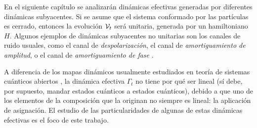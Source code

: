 En el siguiente capítulo se analizarán dinámicas efectivas generadas por diferentes dinámicas subyacentes. Si se asume que el sistema conformado por las partículas es cerrado, entonces la evolución $\mathcal{V}_{t}$ será unitaria, generada por un hamiltoniano $H$. Algunos ejemplos de dinámicas subyacentes no unitarias son los canales de ruido usuales, como el canal de \textit{despolarización}, el canal de \textit{amortiguamiento de amplitud}, o el canal de \textit{amortiguamiento de fase} \cite{Chuang,Wilde}. 



A diferencia de los mapas dinámicos usualmente estudiados en teoría de sistemas cuánticos abiertos \cite{Breuer}, la dinámica efectiva $\Gamma_{t}$ no tiene por qué ser lineal (sí debe, por supuesto, mandar estados cuánticos a estados cuánticos), debido a que uno de los elementos de la composición que la originan no siempre es lineal: la aplicación de asignación. El estudio de las particularidades de algunas de estas dinámicas efectivas es el foco de este trabajo.


